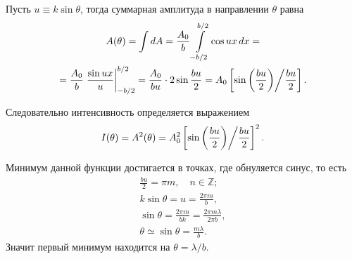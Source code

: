 Пусть $u \equiv k \sin \theta$, тогда суммарная амплитуда в направлении $\theta$ равна
\begin{multline*}
	A(\theta)
	= \int dA
	= \frac{A_0}{b} \int\limits_{-b/2}^{b/2} \cos ux \,d x =\\
	= \frac{A_0}{b} \left. \frac{\sin ux}{u} \right|_{-b/2}^{b/2}
	= \frac{A_0}{bu} \cdot 2 \sin \frac{bu}{2} = A_0 \left[ \sin \left( \frac{bu}{2}\right) \middle/  \frac{bu}{2} \right] .
\end{multline*}

Следовательно интенсивность определяется выражением
\begin{equation}
	I(\theta) = A^2(\theta) = A_0^2 \left[ \sin \left( \frac{bu}{2}\right) \middle/  \frac{bu}{2} \right]^2.
\end{equation}

Минимум данной функции достигается в точках, где обнуляется синус, то есть
\begin{gather*}
	\frac{bu}{2} = \pi m, \quad n \in \mathbb Z;\\
	k \sin \theta = u = \frac{2 \pi m}{b},\\
	\sin \theta = \frac{2 \pi m}{bk} = \frac{2 \pi m \lambda}{2 \pi b},\\
	\theta \simeq \sin \theta = \frac{m \lambda}{b}.
\end{gather*}
Значит первый минимум находится на $\theta = \lambda/b$.


